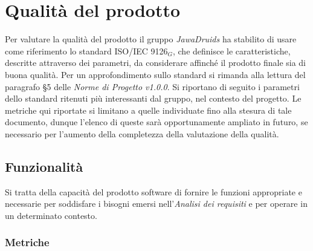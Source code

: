 \chapter{Qualità del prodotto} \label{QualitàDelProdotto}

Per valutare la qualità del prodotto il gruppo \textit{JawaDruids} ha stabilito di usare come riferimento lo standard ISO/IEC 9126$_G$, che definisce le caratteristiche, descritte attraverso dei parametri,  da considerare affinché il prodotto finale sia di buona qualità. 
Per un approfondimento sullo standard si rimanda alla lettura del paragrafo §5 delle \textit{Norme di Progetto v1.0.0}. 
Si riportano di seguito i parametri dello standard ritenuti più interessanti dal gruppo, nel contesto del  progetto.
Le metriche qui riportate si limitano a quelle individuate fino alla stesura di tale documento, dunque l’elenco di queste sarà opportunamente ampliato in futuro, se necessario per l’aumento della completezza della valutazione della qualità.

\section{Funzionalità} \label{3.1}
Si tratta della capacità del prodotto software di fornire le funzioni appropriate e necessarie per soddisfare i bisogni emersi nell’\textit{Analisi dei requisiti} e per operare in un determinato contesto. 
\subsection{Metriche} \label{3.1.1}
